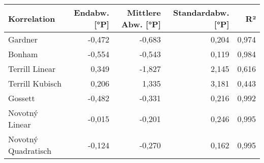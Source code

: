 \begin{tabular}{lrrrr}
\toprule
        Korrelation &  Endabw. [°P] &  Mittlere Abw. [°P] &  Standardabw. [°P] &    R² \\
\midrule
            Gardner &        -0,472 &              -0,683 &              0,204 & 0,974 \\
             Bonham &        -0,554 &              -0,543 &              0,119 & 0,984 \\
     Terrill Linear &         0,349 &              -1,827 &              2,145 & 0,616 \\
    Terrill Kubisch &         0,206 &               1,335 &              3,181 & 0,443 \\
            Gossett &        -0,482 &              -0,331 &              0,216 & 0,992 \\
     Novotný Linear &        -0,015 &              -0,201 &              0,246 & 0,995 \\
Novotný Quadratisch &        -0,124 &              -0,270 &              0,162 & 0,995 \\
\bottomrule
\end{tabular}
